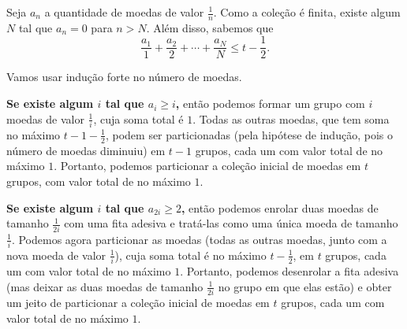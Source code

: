 \documentclass[10pt, a4paper]{article}
\begin{document}
	Seja $a_n$ a quantidade de moedas de valor $\frac{1}{n}$. Como a coleção é finita, existe algum $N$ tal que $a_n = 0$ para $n > N$. Além disso, sabemos que \[\frac{a_1}{1} + \frac{a_2}{2} + \cdots + \frac{a_N}{N} \le t - \frac{1}{2}.\]


		


	Vamos usar indução forte no número de moedas.
	
	{\bfseries\boldmath Se existe algum $i$ tal que $a_i \ge i$,} então podemos formar um grupo com $i$ moedas de valor $\frac{1}{i}$, cuja soma total é $1$. Todas as outras moedas, que tem soma no máximo $t - 1 - \frac{1}{2}$, podem ser particionadas (pela hipótese de indução, pois o número de moedas diminuiu) em $t - 1$ grupos, cada um com valor total de no máximo $1$. Portanto, podemos particionar a coleção inicial de moedas em $t$ grupos, com valor total de no máximo $1$.

	{\bfseries\boldmath Se existe algum $i$ tal que $a_{2i} \ge 2$,} então podemos enrolar duas moedas de tamanho $\frac{1}{2i}$ com uma fita adesiva e tratá-las como uma única moeda de tamanho $\frac{1}{i}$. Podemos agora particionar as moedas (todas as outras moedas, junto com a nova moeda de valor $\frac{1}{i}$), cuja soma total é no máximo $t - \frac{1}{2}$, em $t$ grupos, cada um com valor total de no máximo $1$. Portanto, podemos desenrolar a fita adesiva (mas deixar as duas moedas de tamanho $\frac{1}{2i}$ no grupo em que elas estão) e obter um jeito de particionar a coleção inicial de moedas em $t$ grupos, cada um com valor total de no máximo $1$.
\end{document}
